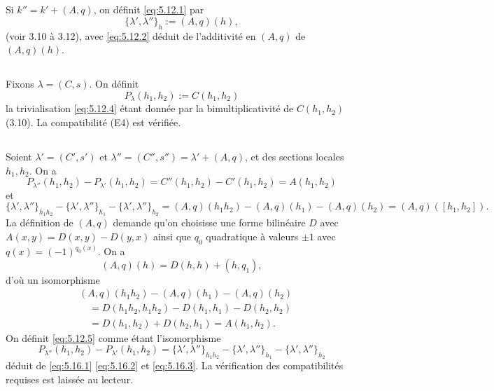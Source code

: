 \documentclass[12pt,a4paper]{article}
\theoremstyle{plain}
\theoremstyle{definition}
\theoremstyle{remark}
\begin{document}
\subsection{}

Si $k'' = k' + (A, q)$, on définit \eqref{eq:5.12.1} par
\[
\{\lambda', \lambda''\}_h := (A, q)(h),
\]
(voir 3.10 à 3.12), avec \eqref{eq:5.12.2} déduit de l'additivité en $(A, q)$ de $(A, q)(h)$.

\subsection{}

Fixons $\lambda = (C, s)$. On définit
\[
P_\lambda(h_1, h_2) := C(h_1, h_2)
\]
la trivialisation \eqref{eq:5.12.4} étant donnée par la bimultiplicativité de $C(h_1, h_2)$ (3.10).
La compatibilité (E4) est vérifiée.

\subsection{}

Soient $\lambda' = (C', s')$ et $\lambda'' = (C'', s'') = \lambda' + (A, q)$, et des sections locales
$h_1, h_2$. On a
\begin{equation}\label{eq:5.16.1}
P_{\lambda''}(h_1, h_2) - P_{\lambda'}(h_1, h_2) = C''(h_1, h_2) - C'(h_1, h_2) = A(h_1, h_2)
\end{equation}
et
\begin{equation}\label{eq:5.16.2}
\{\lambda', \lambda''\}_{h_1 h_2} - \{\lambda', \lambda''\}_{h_1} - \{\lambda', \lambda''\}_{h_2} = (A, q)(h_1 h_2) - (A, q)(h_1) - (A, q)(h_2) = (A, q)([h_1, h_2]).
\end{equation}
La définition de $(A, q)$ demande qu'on choisisse une forme bilinéaire $D$ avec
$A(x, y) = D(x, y) - D(y, x)$ ainsi que $q_0$ quadratique à valeurs $\pm 1$ avec
$q(x) = (-1)^{q_0(x)}$.
On a
\[
(A, q)(h) = D(h, h) + (h, q_1),
\]
d'où un isomorphisme
\begin{equation}\label{eq:5.16.3}
\begin{aligned}
&(A, q)(h_1 h_2) - (A, q)(h_1) - (A, q)(h_2) \\
&\quad = D(h_1 h_2, h_1 h_2) - D(h_1, h_1) - D(h_2, h_2) \\
&\quad = D(h_1, h_2) + D(h_2, h_1) = A(h_1, h_2).
\end{aligned}
\end{equation}
On définit \eqref{eq:5.12.5} comme étant l'isomorphisme
\[
P_{\lambda''}(h_1, h_2) - P_{\lambda'}(h_1, h_2) = \{\lambda', \lambda''\}_{h_1 h_2} - \{\lambda', \lambda''\}_{h_1} - \{\lambda', \lambda''\}_{h_2}
\]
déduit de \eqref{eq:5.16.1} \eqref{eq:5.16.2} et \eqref{eq:5.16.3}. La vérification des compatibilités requises est
laissée au lecteur.
\end{document}
